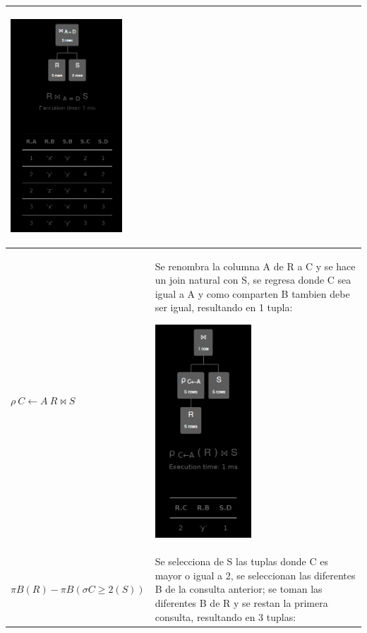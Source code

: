 \begin{longtable}{|p{4.3cm}|p{12cm}|}
    \begin{center}
        \includegraphics[height=8cm]{../resources/pregunta1/1.5.png}
    \end{center}
    \\ \hline
    
    \textbf{$\rho \ C \leftarrow A \ R \bowtie S$} & 
    Se renombra la columna A de R a C y se hace un join natural con S, se regresa donde C sea igual a A y como comparten B tambien debe ser igual, resultando en 1 tupla:

    \begin{center}
        \includegraphics[height=8cm]{../resources/pregunta1/1.6.png}
    \end{center}
    \\ \hline
    
    \textbf{$\pi B (R) - \pi B (\sigma C \geq 2 (S))$} & 
    Se selecciona de S las tuplas donde C es mayor o igual a 2, se seleccionan las diferentes B de la consulta anterior; se toman las diferentes B de R y se restan la primera consulta, resultando en 3 tuplas:


\end{longtable}
